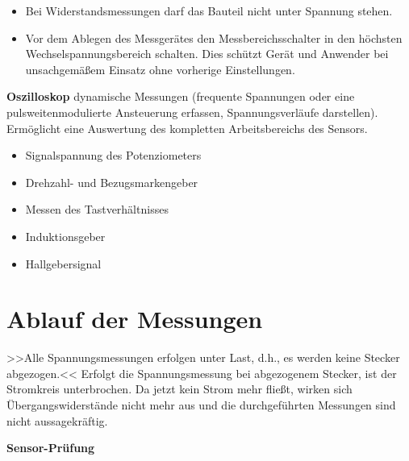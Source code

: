 \begin{itemize}
\item
  Bei Widerstandsmessungen darf das Bauteil nicht unter Spannung stehen.
\item
  Vor dem Ablegen des Messgerätes den Messbereichsschalter in den
  höchsten Wechselspannungsbereich schalten. Dies schützt Gerät und
  Anwender bei unsachgemäßem Einsatz ohne vorherige Einstellungen.
\end{itemize}

\textbf{Oszilloskop} dynamische Messungen (frequente Spannungen oder
eine pulsweitenmodulierte Ansteuerung erfassen, Spannungsverläufe
darstellen). Ermöglicht eine Auswertung des kompletten Arbeitsbereichs
des Sensors.

\begin{itemize}
\item
  Signalspannung des Potenziometers
\item
  Drehzahl- und Bezugsmarkengeber
\item
  Messen des Tastverhältnisses
\item
  Induktionsgeber
\item
  Hallgebersignal
\end{itemize}

\section{Ablauf der Messungen}\label{ablauf-der-messungen}

>>Alle Spannungsmessungen erfolgen unter Last, d.h., es werden keine
Stecker abgezogen.<< Erfolgt die Spannungsmessung bei abgezogenem
Stecker, ist der Stromkreis unterbrochen. Da jetzt kein Strom mehr
fließt, wirken sich Übergangswiderstände nicht mehr aus und die
durchgeführten Messungen sind nicht aussagekräftig.

\textbf{Sensor-Prüfung}

